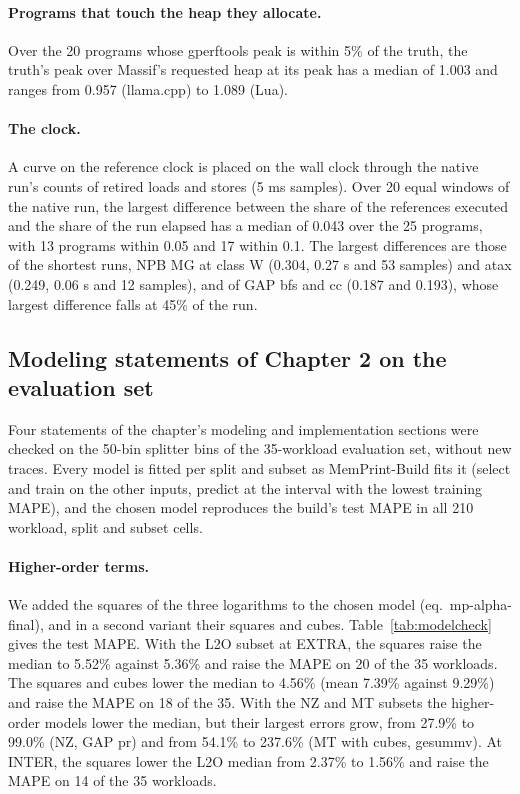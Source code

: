 \documentclass[11pt]{article}
\begin{document}
\paragraph{Programs that touch the heap they allocate.} Over the 20 programs whose gperftools peak is within 5\% of
the truth, the truth's peak over Massif's requested heap at its peak has a median of 1.003 and ranges from 0.957
(llama.cpp) to 1.089 (Lua).

\paragraph{The clock.} A curve on the reference clock is placed on the wall clock through the native run's counts of
retired loads and stores (5 ms samples). Over 20 equal windows of the native run, the largest difference between the
share of the references executed and the share of the run elapsed has a median of 0.043 over the 25 programs, with
13 programs within 0.05 and 17 within 0.1. The largest differences are those of the shortest runs, NPB MG at class
W (0.304, 0.27 s and 53 samples) and atax (0.249, 0.06 s and 12 samples), and of GAP bfs and cc (0.187 and 0.193),
whose largest difference falls at 45\% of the run.

\subsection{Modeling statements of Chapter 2 on the evaluation set}
\label{sec:modelcheck}

Four statements of the chapter's modeling and implementation sections were checked on the 50-bin splitter bins of
the 35-workload evaluation set, without new traces. Every model is fitted per split and subset as MemPrint-Build fits
it (select and train on the other inputs, predict at the interval with the lowest training MAPE), and the chosen model
reproduces the build's test MAPE in all 210 workload, split and subset cells.

\paragraph{Higher-order terms.} We added the squares of the three logarithms to the chosen model (eq.\ mp-alpha-final),
and in a second variant their squares and cubes. Table~\ref{tab:modelcheck} gives the test MAPE. With the L2O subset
at EXTRA, the squares raise the median to 5.52\% against 5.36\% and raise the MAPE on 20 of the 35 workloads. The
squares and cubes lower the median to 4.56\% (mean 7.39\% against 9.29\%) and raise the MAPE on 18 of the 35. With
the NZ and MT subsets the higher-order models lower the median, but their largest errors grow, from 27.9\% to
99.0\% (NZ, GAP pr) and from 54.1\% to 237.6\% (MT with cubes, gesummv). At INTER, the squares lower the L2O median
from 2.37\% to 1.56\% and raise the MAPE on 14 of the 35 workloads.
\end{document}
